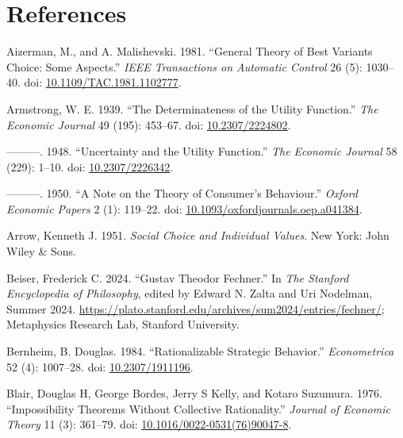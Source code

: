 \documentclass[
  11pt,
  letterpaper,
  DIV=11,
  numbers=noendperiod,
  twoside]{scrartcl}
\newlength{\cslhangindent}
\newenvironment{CSLReferences}[2] %
 {\begin{list}{}{%
  \setlength{\itemindent}{0pt}
  \setlength{\leftmargin}{0pt}
  \setlength{\parsep}{0pt}
  \ifodd #1
   \setlength{\leftmargin}{\cslhangindent}
   \setlength{\itemindent}{-1\cslhangindent}
  \fi
  \setlength{\itemsep}{#2\baselineskip}}}
 {\end{list}}
\begin{document}
\section*{References}\label{references}

\label{refs}
\begin{CSLReferences}{1}{0}
Aizerman, M., and A. Malishevski. 1981. {``General Theory of Best
Variants Choice: Some Aspects.''} \emph{IEEE Transactions on Automatic
Control} 26 (5): 1030--40. doi:
\href{https://doi.org/10.1109/TAC.1981.1102777}{10.1109/TAC.1981.1102777}.

Armstrong, W. E. 1939. {``The Determinateness of the Utility
Function.''} \emph{The Economic Journal} 49 (195): 453--67. doi:
\href{https://doi.org/10.2307/2224802}{10.2307/2224802}.

---------. 1948. {``Uncertainty and the Utility Function.''} \emph{The
Economic Journal} 58 (229): 1--10. doi:
\href{https://doi.org/10.2307/2226342}{10.2307/2226342}.

---------. 1950. {``A Note on the Theory of Consumer's Behaviour.''}
\emph{Oxford Economic Papers} 2 (1): 119--22. doi:
\href{https://doi.org/10.1093/oxfordjournals.oep.a041384}{10.1093/oxfordjournals.oep.a041384}.

Arrow, Kenneth J. 1951. \emph{Social Choice and Individual Values}. New
York: John Wiley \& Sons.

Beiser, Frederick C. 2024. {``{Gustav Theodor Fechner}.''} In \emph{The
{Stanford} Encyclopedia of Philosophy}, edited by Edward N. Zalta and
Uri Nodelman, {S}ummer 2024.
\url{https://plato.stanford.edu/archives/sum2024/entries/fechner/};
Metaphysics Research Lab, Stanford University.

Bernheim, B. Douglas. 1984. {``Rationalizable Strategic Behavior.''}
\emph{Econometrica} 52 (4): 1007--28. doi:
\href{https://doi.org/10.2307/1911196}{10.2307/1911196}.

Blair, Douglas H, George Bordes, Jerry S Kelly, and Kotaro Suzumura.
1976. {``Impossibility Theorems Without Collective Rationality.''}
\emph{Journal of Economic Theory} 11 (3): 361--79. doi:
\href{https://doi.org/10.1016/0022-0531(76)90047-8}{10.1016/0022-0531(76)90047-8}.


\end{CSLReferences}
\end{document}
